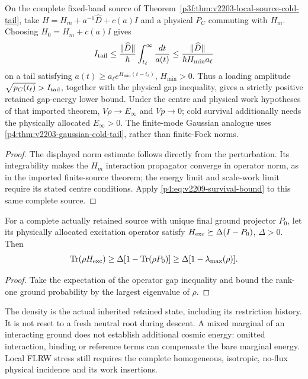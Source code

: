 \documentclass[12pt,a4paper]{article}
\begin{document}
\begin{corollary}
\label{p4:cor:v2209-native-tail-retention}
On the complete fixed-band source of
Theorem~\ref{p3f:thm:v2203-local-source-cold-tail}, take
\(H=H_m+a^{-1}\widehat D+c(a)I\) and a physical \(P_C\) commuting
with \(H_m\). Choosing \(H_0=H_m+c(a)I\) gives
\[
 I_{\rm tail}\le\frac{\|\widehat D\|}{\hbar}
 \int_{t_\ell}^{\infty}\frac{dt}{a(t)}
 \le\frac{\|\widehat D\|}{\hbar H_{\min}a_\ell}
\]
on a tail satisfying \(a(t)\ge a_\ell e^{H_{\min}(t-t_\ell)}\),
\(H_{\min}>0\). Thus a loading amplitude
\(\sqrt{p_C(t_\ell)}>I_{\rm tail}\), together with the physical gap
inequality, gives a strictly positive retained gap-energy lower bound.
Under the centre and physical work hypotheses of that imported theorem,
\(V\rho\to E_\infty\) and \(Vp\to0\); cold survival additionally needs
the physically allocated \(E_\infty>0\). The finite-mode Gaussian analogue
uses \ref{p4:thm:v2203-gaussian-cold-tail}, rather than finite-Fock norms.
\end{corollary}
\begin{proof}
The displayed norm estimate follows directly from the perturbation.
Its integrability makes the \(H_m\) interaction propagator converge
in operator norm, as in the imported finite-source theorem; the energy
limit and scale-work limit require its stated centre conditions.
Apply \eqref{p4:eq:v2209-survival-bound} to this same complete source.
\end{proof}

\begin{proposition}
\label{p4:prop:v2209-inherited-mixedness-gap}
For a complete actually retained source with unique final ground projector
\(P_0\), let its physically allocated excitation operator satisfy
\(H_{\rm exc}\succeq\Delta(I-P_0)\), \(\Delta>0\). Then
\[
 \operatorname{Tr}(\rho H_{\rm exc})
 \ge\Delta[1-\operatorname{Tr}(\rho P_0)]
 \ge\Delta[1-\lambda_{\max}(\rho)].
\]
\end{proposition}
\begin{proof}
Take the expectation of the operator gap inequality and bound the
rank-one ground probability by the largest eigenvalue of \(\rho\).
\end{proof}
The density is the actual inherited retained state, including its restriction
history. It is not reset to a fresh neutral root during descent. A mixed
marginal of an interacting ground does not establish additional cosmic
energy: omitted interaction, binding or reference terms can compensate
the bare marginal energy. Local FLRW stress still requires the complete
homogeneous, isotropic, no-flux physical incidence and its work insertions.
\end{document}
